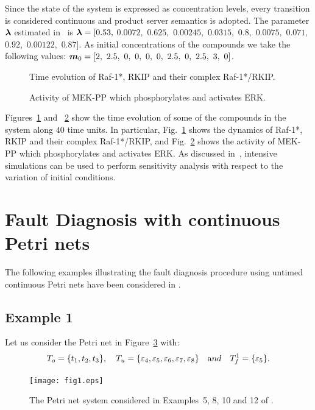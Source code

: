 Since the state of the system is expressed as concentration levels, every transition
is considered continuous and product server semantics is adopted. The parameter
$\b{\lambda}$ estimated in~\cite{IPChShKi03} is
$\b{\lambda}= [0.53,$ $0.0072,$ $0.625,$ $0.00245,$ $0.0315,$ $0.8,$ $0.0075,$ $0.071,$ $0.92,$ $0.00122,$ $0.87]$.
As initial concentrations of the compounds we take the following values:
$\mo=[2,\ 2.5,\ 0,\ 0,\ 0,\ 0,\ 2.5,\ 0,\ 2.5,\ 3,\ 0]$.

\begin{figure}
   \caption{Time evolution of Raf-1*, RKIP and their complex Raf-1*/RKIP.}
   \label{f-mf1c1}
\end{figure}

\begin{figure}
   \caption{Activity of MEK-PP which phosphorylates and activates ERK.}
   \label{f-mf1c2}
\end{figure}

Figures~\ref{f-mf1c1} and ~\ref{f-mf1c2} show the time evolution of some
of the compounds in the system along $40$ time units. In particular, Fig.~\ref{f-mf1c1}
shows the dynamics of Raf-1*, RKIP and their complex Raf-1*/RKIP, and
Fig.~\ref{f-mf1c2} shows the activity of MEK-PP which phosphorylates and activates ERK.
As discussed in~\cite{IPChShKi03}, intensive simulations can be used to
perform sensitivity analysis with respect to the variation of initial conditions.


\section{Fault Diagnosis with continuous Petri nets}
\label{sec:fdsexamps}

The following examples illustrating the fault diagnosis procedure using untimed continuous Petri nets have been considered in \cite{ARMASECASI12}. 

\subsection{Example 1}
Let us consider the Petri net in Figure~\ref{f-es1} with:
$$T_o=\{t_1, t_2, t_3 \}, \quad T_u=\{ \varepsilon_4, \varepsilon_5, \varepsilon_6, \varepsilon_7,
\varepsilon_8 \} \quad {\text and} \quad T_f^1=\{ \varepsilon_5\}.$$

\begin{figure}[]
\begin{center}
\texttt{[image: fig1.eps]}
\caption[]{The Petri net system considered in Examples~5, 8, 10 and
12 of \cite{ARMASECASI12}.}
   \label{f-es1}
\end{center}
\end{figure}

